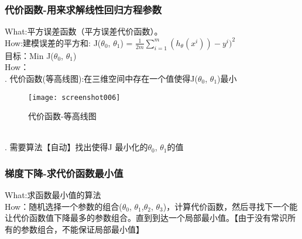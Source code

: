\documentclass[
10pt, %
a4paper, %
oneside, %
headinclude,footinclude, %
BCOR5mm, %
]{scrartcl}
\begin{document}
\subsubsection{\color{blue}代价函数-用来求解线性回归方程参数}
What:平方误差函数（平方误差代价函数）。
\\How:建模误差的平方和: J($\theta_0$, $\theta_1$) = $\frac{1}{2m}\sum_{i=1}^m (h_\theta(x^i))-y^i)^2$
\\\indent 目标：Min J($\theta_0$, $\theta_1$)
\\\indent How：
\\. 代价函数(等高线图):在三维空间中存在一个值使得J($\theta_0$, $\theta_1$)最小
\begin{figure}[!htb]
	\centering
	\texttt{[image: screenshot006]}
	\caption{代价函数-等高线图}
	\label{fig:screenshot006}
\end{figure}
\\. 需要算法【自动】找出使得J 最小化的$\theta_0$, $\theta_1$的值
\subsubsection{\color{blue}梯度下降-求代价函数最小值}
What:求函数最小值的算法
\\How：随机选择一个参数的组合($\theta_0$, $\theta_1$,$\theta_2$, $\theta_3$)，计算代价函数，然后寻找下一个能让代价函数值下降最多的参数组合。直到到达一个局部最小值。【由于没有常识所有的参数组合，不能保证局部最小值】
\end{document}
